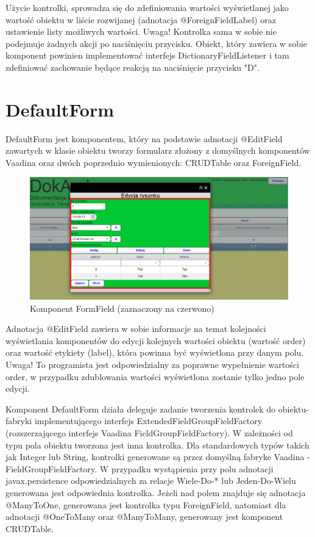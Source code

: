 Użycie kontrolki, sprowadza się do zdefiniowania wartości wyświetlanej jako wartość obiektu w liście rozwijanej (adnotacja @ForeignFieldLabel) oraz ustawienie listy możliwych wartości. Uwaga! Kontrolka sama w sobie nie podejmuje żadnych akcji po naciśnięciu przycisku. Obiekt, który zawiera w sobie komponent powinien implementować interfejs DictionaryFieldListener i tam zdefiniować zachowanie będące reakcją na naciśnięcie przycisku "D".
\section{DefaultForm}
DefaultForm jest komponentem, który na podstawie adnotacji @EditField zawartych w klasie obiektu tworzy formularz złożony z domyślnych komponentów Vaadina oraz dwóch poprzednio wymienionych: CRUDTable oraz ForeignField. 

\newpage
\begin{figure} [H]
    \begin{center}
	\includegraphics[scale=.6]{img/formField.png}
	\caption{Komponent FormField (zaznaczony na czerwono)}
	\label{foreignField}
    \end{center}
\end{figure}

Adnotacja @EditField zawiera w sobie informacje na temat kolejności wyświetlania komponentów do edycji kolejnych wartości obiektu (wartość order) oraz wartość etykiety (label), która powinna być wyświetlona przy danym polu. Uwaga! To programista jest odpowiedzialny za poprawne wypełnienie wartości order, w przypadku zdublowania wartości wyświetlona zostanie tylko jedno pole edycji.

Komponent DefaultForm działa deleguje zadanie tworzenia kontrolek do obiektu-fabryki implementującego interfejs ExtendedFieldGroupFieldFactory (rozszerzającego interfejs Vaadina FieldGroupFieldFactory). W zależności od typu pola obiektu tworzona jest inna kontrolka. Dla standardowych typów takich jak Integer lub String, kontrolki generowane są przez domyślną fabryke Vaadina - FieldGroupFieldFactory. W przypadku wystąpienia przy polu adnotacji javax.persistence odpowiedzialnych za relacje Wiele-Do-* lub Jeden-Do-Wielu generowana jest odpowiednia kontrolka. Jeżeli nad polem znajduje się adnotacja @ManyToOne, generowana jest kontrolka typu ForeignField, natomiast dla adnotacji @OneToMany oraz @ManyToMany, generowany jest komponent CRUDTable.

